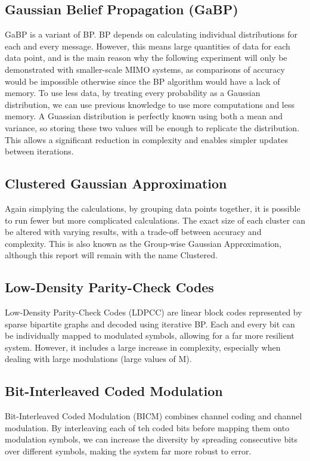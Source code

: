 \documentclass[conference]{IEEEtran}
\begin{document}
\subsection{Gaussian Belief Propagation (GaBP)}
GaBP is a variant of BP. BP depends on calculating individual distributions for each and every message. However, this means large quantities of data for each data point, and is the main reason why the following experiment will only be demonstrated with smaller-scale MIMO systems, as comparisons of accuracy would be impossible otherwise since the BP algorithm would have a lack of memory. To use less data, by treating every probability as a Gaussian distribution, we can use previous knowledge to use more computations and less memory. A Guassian distribution is perfectly known using both a mean and variance, so storing these two values will be enough to replicate the distribution. This allows a significant reduction in complexity and enables simpler updates between iterations.

\subsection{Clustered Gaussian Approximation}
Again simplying the calculations, by grouping data points together, it is possible to run fewer but more complicated calculations. The exact size of each cluster can be altered with varying results, with a trade-off between accuracy and complexity. This is also known as the Group-wise Gaussian Approximation, although this report will remain with the name Clustered.

\subsection{Low-Density Parity-Check Codes}
Low-Density Parity-Check Codes (LDPCC) are linear block codes represented by sparse bipartite graphs and decoded using iterative BP. Each and every bit can be individually mapped to modulated symbols, allowing for a far more resilient system. However, it includes a large increase in complexity, especially when dealing with large modulations (large values of M).

\subsection{Bit-Interleaved Coded Modulation}
Bit-Interleaved Coded Modulation (BICM) combines channel coding and channel modulation. By interleaving each of teh coded bits before mapping them onto modulation symbols, we can increase the diversity by spreading consecutive bits over different symbols, making the system far more robust to error.
\end{document}
